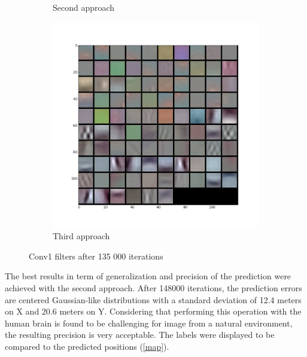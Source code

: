 \begin{figure}[!h]
\begin{subfigure}{0.33\textwidth}
\caption{Second approach}
\end{subfigure}%
\begin{subfigure}{0.33\textwidth}
\label{3appfilter}
\centering
\includegraphics[width=0.9\linewidth]{images/regression/conv1_30_135000.png}
\caption{Third approach}
\end{subfigure}
\caption{Conv1 filters after 135 000 iterations}
\end{figure}

The best results in term of generalization and precision of the prediction were achieved with the second approach. After 148000 iterations, the prediction errors are centered Gaussian-like distributions with a standard deviation of 12.4 meters on X and 20.6 meters on Y. Considering that performing this operation with the human brain is found to be challenging for image from a natural environment, the resulting precision is very acceptable. The labels were displayed to be compared to the predicted positions (\ref{map}).

